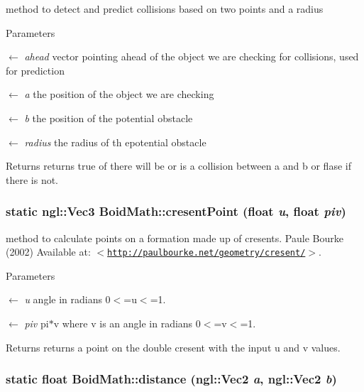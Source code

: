 method to detect and predict collisions based on two points and a radius 
\begin{DoxyParams}{Parameters}
\item[\mbox{$\leftarrow$} {\em ahead}]vector pointing ahead of the object we are checking for collisions, used for prediction \item[\mbox{$\leftarrow$} {\em a}]the position of the object we are checking \item[\mbox{$\leftarrow$} {\em b}]the position of the potential obstacle \item[\mbox{$\leftarrow$} {\em radius}]the radius of th epotential obstacle \end{DoxyParams}
\begin{DoxyReturn}{Returns}
returns true of there will be or is a collision between a and b or flase if there is not. 
\end{DoxyReturn}
\hypertarget{classBoidMath_aaf61747aac10ac35975469f9e1b67e66}{
\subsubsection[{cresentPoint}]{\setlength{\rightskip}{0pt plus 5cm}static ngl::Vec3 BoidMath::cresentPoint (float {\em u}, \/  float {\em piv})}}
\label{classBoidMath_aaf61747aac10ac35975469f9e1b67e66}


method to calculate points on a formation made up of cresents. Paule Bourke (2002) Available at: $<$\href{http://paulbourke.net/geometry/cresent/}{\tt http://paulbourke.net/geometry/cresent/}$>$. 
\begin{DoxyParams}{Parameters}
\item[\mbox{$\leftarrow$} {\em u}]angle in radians 0$<$=u$<$=1. \item[\mbox{$\leftarrow$} {\em piv}]pi$\ast$v where v is an angle in radians 0$<$=v$<$=1. \end{DoxyParams}
\begin{DoxyReturn}{Returns}
returns a point on the double cresent with the input u and v values. 
\end{DoxyReturn}
\hypertarget{classBoidMath_aa3410e24db5ea38c42b509e130810a52}{
\subsubsection[{distance}]{\setlength{\rightskip}{0pt plus 5cm}static float BoidMath::distance (ngl::Vec2 {\em a}, \/  ngl::Vec2 {\em b})}}
\label{classBoidMath_aa3410e24db5ea38c42b509e130810a52}


